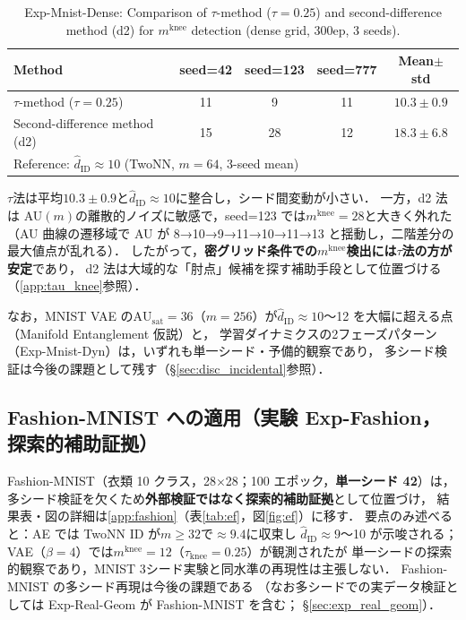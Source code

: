 \documentclass[11pt,a4paper]{jsarticle}
\newcommand{\AUsat}{\mathrm{AU}_{\mathrm{sat}}}
\newcommand{\mknee}{m^{\mathrm{knee}}}
\begin{document}
\begin{table}[H]
\centering
\caption{Exp-Mnist-Dense: Comparison of $\tau$-method ($\tau=0.25$) and second-difference method (d2) for $\mknee$ detection (dense grid, 300ep, 3 seeds).}
\label{tab:el_knee_compare}
\small
\begin{tabular}{lcccc}
\toprule
Method & seed=42 & seed=123 & seed=777 & Mean$\pm$std \\
\midrule
$\tau$-method ($\tau=0.25$) & 11 & 9  & 11 & $10.3 \pm 0.9$ \\
Second-difference method (d2) & 15 & 28 & 12 & $18.3 \pm 6.8$ \\
\midrule
\multicolumn{5}{l}{Reference: $\hat{d}_\mathrm{ID} \approx 10$ (TwoNN, $m=64$, 3-seed mean)} \\
\bottomrule
\end{tabular}
\end{table}

$\tau$法は平均$10.3 \pm 0.9$と$\hat{d}_\mathrm{ID} \approx 10$に整合し，シード間変動が小さい．
一方，d2 法は AU$(m)$の離散的ノイズに敏感で，seed=123 では$\mknee = 28$と大きく外れた
（AU 曲線の遷移域で AU が 8→10→9→11→10→11→13 と揺動し，二階差分の最大値点が乱れる）．
したがって，\textbf{密グリッド条件での$\mknee$検出には$\tau$法の方が安定}であり，
d2 法は大域的な「肘点」候補を探す補助手段として位置づける（\ref{app:tau_knee}参照）．

なお，MNIST VAE の$\AUsat = 36$（$m=256$）が$\hat{d}_\mathrm{ID} \approx 10$〜12 を大幅に超える点（Manifold Entanglement 仮説）と，
学習ダイナミクスの2フェーズパターン（Exp-Mnist-Dyn）は，いずれも単一シード・予備的観察であり，
多シード検証は今後の課題として残す（§\ref{sec:disc_incidental}参照）．

\subsection{Fashion-MNIST への適用（実験 Exp-Fashion，探索的補助証拠）}\label{sec:exp_fashion}

Fashion-MNIST（衣類 10 クラス，28×28；100 エポック，\textbf{単一シード 42}）は，
多シード検証を欠くため\textbf{外部検証ではなく探索的補助証拠}として位置づけ，
結果表・図の詳細は\ref{app:fashion}（表\ref{tab:ef}，図\ref{fig:ef}）に移す．
要点のみ述べると：AE では TwoNN ID が$m \geq 32$で$\approx 9.4$に収束し
$\hat{d}_\mathrm{ID} \approx 9$〜10 が示唆される；
VAE（$\beta = 4$）では$\mknee = 12$（$\tau_{\mathrm{knee}} = 0.25$）が観測されたが
単一シードの探索的観察であり，MNIST 3シード実験と同水準の再現性は主張しない．
Fashion-MNIST の多シード再現は今後の課題である
（なお多シードでの実データ検証としては Exp-Real-Geom が Fashion-MNIST を含む；
§\ref{sec:exp_real_geom}）．
\end{document}

